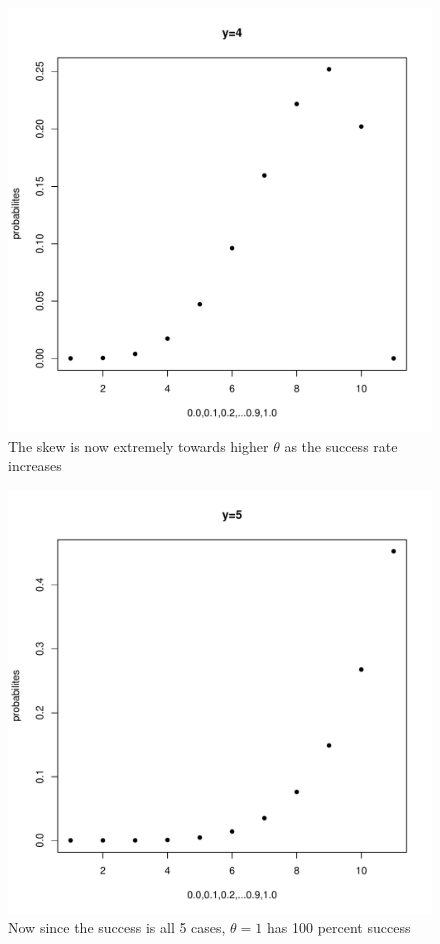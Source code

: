 \documentclass[11pt]{article}
\begin{document}
\begin{enumerate}
\begin{enumerate}
\begin{figure}[H]
	\end{figure}
	\begin{figure}[H]
		\centering
		\caption{The skew is now extremely towards higher $\theta$ as the success rate increases}
		\includegraphics[scale=.6]{y=4graph.pdf}
	\end{figure}
	\begin{figure}[H]
		\centering
		\caption{Now since the success is all 5 cases, $\theta=1$ has 100 percent success}
		\includegraphics[scale=.6]{y=5graph.pdf}

\end{figure}
\end{enumerate}
\end{enumerate}
\end{document}
